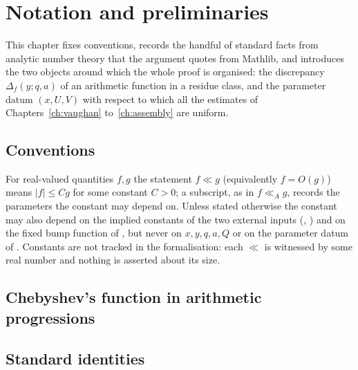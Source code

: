\chapter{Notation and preliminaries}\label{ch:prelim}

This chapter fixes conventions, records the handful of standard facts from analytic number theory
that the argument quotes from Mathlib, and introduces the two objects around which the whole proof is
organised: the discrepancy $\Delta_f(y; q, a)$ of an arithmetic function in a residue class, and the
parameter datum $(x, U, V)$ with respect to which all the estimates of Chapters~\ref{ch:vaughan}
to~\ref{ch:assembly} are uniform.

\section{Conventions}

\begin{notation}\label{not:asymptotic}
For real-valued quantities $f, g$ the statement $f \ll g$ (equivalently $f = O(g)$) means $|f| \le C g$
for some constant $C > 0$; a subscript, as in $f \ll_A g$, records the parameters the constant may
depend on. Unless stated otherwise the constant may also depend on the implied constants of the two
external inputs (, ) and on the fixed bump function of
, but never on $x, y, q, a, Q$ or on the parameter datum of .
Constants are not tracked in the formalisation: each $\ll$ is witnessed by some real number and
nothing is asserted about its size.
\leanok
\end{notation}



\section{Chebyshev's function in arithmetic progressions}





\section{Standard identities}

